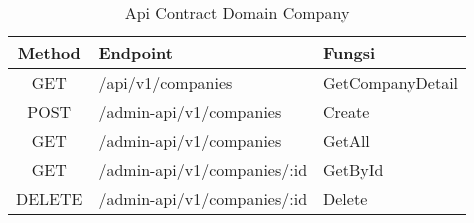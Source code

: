 \bgroup
\begin{table}[ht]
  \caption{Api Contract Domain Company}
  \label{tab:api-contract-domain-company}
  \def\arraystretch{1.7}
  \centering
  \begin{tabular}{|c|p{6cm}|p{4cm}|}
    \hline
    Method & Endpoint                    &
    Fungsi                                                  \\
    \hline
    GET    & /api/v1/companies           & GetCompanyDetail \\
    \hline
    POST   & /admin-api/v1/companies     & Create           \\
    \hline
    GET    & /admin-api/v1/companies     & GetAll           \\
    \hline
    GET    & /admin-api/v1/companies/:id & GetById          \\
    \hline
    DELETE & /admin-api/v1/companies/:id & Delete           \\
    \hline
  \end{tabular}
\end{table}
\egroup

